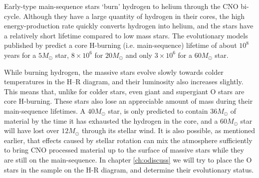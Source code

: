 Early-type main-sequence stars `burn' hydrogen to helium through the CNO
bi-cycle. Although they have a large quantity of hydrogen in their
cores, the high energy-production rate quickly converts hydrogen into
helium, and the stars have a relatively short lifetime compared to low
mass stars. The evolutionary models published by 
predict a core H-burning (i.e. main-sequence) lifetime of about $10^8$
years for a $5M_\odot$ star, $8\times10^6$ for $20M_\odot$ and only
$3\times10^6$ for a $60M_\odot$ star.

While burning hydrogen, the massive stars evolve slowly towards colder
temperatures in the H--R diagram, and their luminosity also increases
slightly. This means that, unlike for colder stars, even giant and
supergiant O stars are core H-burning. These stars also lose an
appreciable amount of mass during their main-sequence lifetimes. A
$40M_\odot$ star, is only predicted to contain $36M_\odot$ of material
by the time it has exhausted the hydrogen in the core, and a
$60M_\odot$ star will have lost over $12M_\odot$ through its stellar
wind. It is also possible, as mentioned earlier, that effects caused
by stellar rotation can mix the atmosphere sufficiently to bring CNO
processed material up to the surface of massive stars while they are
still on the main-sequence. In chapter \ref{ch:odiscuss} we will try
to place the O stars in the sample on the H-R diagram, and determine
their evolutionary status.


